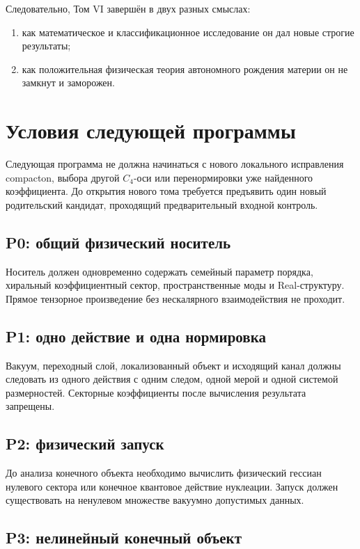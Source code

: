 Следовательно, Том VI завершён в двух разных смыслах:
\begin{enumerate}
 \item как математическое и классификационное исследование он дал новые
 строгие результаты;
 \item как положительная физическая теория автономного рождения материи
 он не замкнут и заморожен.
\end{enumerate}

\section{Условия следующей программы}

Следующая программа не должна начинаться с нового локального исправления
compacton, выбора другой $C_4$-оси или перенормировки уже найденного
коэффициента. До открытия нового тома требуется предъявить один новый
родительский кандидат, проходящий предварительный входной контроль.

\subsection*{P0: общий физический носитель}

Носитель должен одновременно содержать семейный параметр порядка,
хиральный коэффициентный сектор, пространственные моды и Real-структуру.
Прямое тензорное произведение без нескалярного взаимодействия не проходит.

\subsection*{P1: одно действие и одна нормировка}

Вакуум, переходный слой, локализованный объект и исходящий канал должны
следовать из одного действия с одним следом, одной мерой и одной системой
размерностей. Секторные коэффициенты после вычисления результата запрещены.

\subsection*{P2: физический запуск}

До анализа конечного объекта необходимо вычислить физический гессиан
нулевого сектора или конечное квантовое действие нуклеации. Запуск должен
существовать на ненулевом множестве вакуумно допустимых данных.

\subsection*{P3: нелинейный конечный объект}

